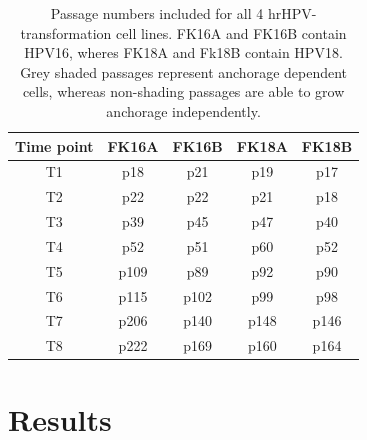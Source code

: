 \begin{table}[htbp]
  \centering
  \caption{Passage numbers included for all 4 hrHPV-transformation cell lines. FK16A and FK16B contain HPV16, wheres FK18A and Fk18B contain HPV18. Grey shaded passages represent anchorage dependent cells, whereas non-shading passages are able to grow anchorage independently.}
    \begin{tabular}{ccccc}
    \hline\hline
    \textbf{Time point} & \textbf{FK16A } & \textbf{FK16B } & \textbf{FK18A } & \textbf{FK18B } \\
    \hline
    T1    & \cellcolor[rgb]{ .753,  .753,  .753}p18 & \cellcolor[rgb]{ .753,  .753,  .753}p21 & \cellcolor[rgb]{ .753,  .753,  .753}p19 & \cellcolor[rgb]{ .753,  .753,  .753}p17 \\
    T2    & \cellcolor[rgb]{ .753,  .753,  .753}p22 & \cellcolor[rgb]{ .753,  .753,  .753}p22 & \cellcolor[rgb]{ .753,  .753,  .753}p21 & \cellcolor[rgb]{ .753,  .753,  .753}p18 \\
    T3    & \cellcolor[rgb]{ .753,  .753,  .753}p39 & p45   & p47   & p40 \\
    T4    & \cellcolor[rgb]{ .753,  .753,  .753}p52 & p51   & p60   & p52 \\
    T5    & p109  & p89   & p92   & p90 \\
    T6    & p115  & p102  & p99   & p98 \\
    T7    & p206  & p140  & p148  & p146 \\
    T8    & p222  & p169  & p160  & p164 \\
    \hline\hline
    \end{tabular}%
  \label{table:table1}%
\end{table}%

\section{Results}

